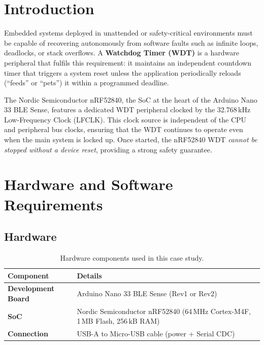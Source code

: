\documentclass[12pt, a4paper]{article}
\begin{document}
\section{Introduction}

Embedded systems deployed in unattended or safety-critical environments must
be capable of recovering autonomously from software faults such as infinite
loops, deadlocks, or stack overflows. A \textbf{Watchdog Timer (WDT)} is a
hardware peripheral that fulfils this requirement: it maintains an independent
countdown timer that triggers a system reset unless the application
periodically reloads (``feeds'' or ``pets'') it within a programmed deadline.

The Nordic Semiconductor nRF52840, the SoC at the heart of the Arduino Nano 33
BLE Sense, features a dedicated WDT peripheral clocked by the 32.768\,kHz
Low-Frequency Clock (LFCLK). This clock source is independent of the CPU and
peripheral bus clocks, ensuring that the WDT continues to operate even when the
main system is locked up. Once started, the nRF52840 WDT \emph{cannot be
stopped without a device reset}, providing a strong safety guarantee.

\section{Hardware and Software Requirements}

\subsection{Hardware}

\begin{table}[h!]
  \centering
  \begin{tabular}{>{\bfseries}p{4cm} p{9cm}}
    \toprule
    Component       & Details \\
    \midrule
    Development Board & Arduino Nano 33 BLE Sense (Rev1 or Rev2) \\
    SoC               & Nordic Semiconductor nRF52840
                        (64\,MHz Cortex-M4F, 1\,MB Flash, 256\,kB RAM) \\
    Connection        & USB-A to Micro-USB cable (power + Serial CDC) \\
    \bottomrule
  \end{tabular}
  \caption{Hardware components used in this case study.}
\end{table}
\end{document}
